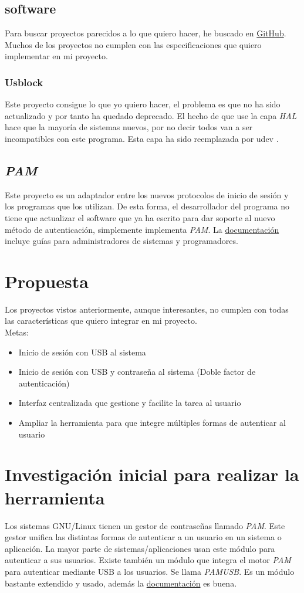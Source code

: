 \documentclass[titlepage]{article}
\begin{document}
\subsection{software}
Para buscar proyectos parecidos a lo que quiero hacer, he buscado en \href{https://github.com/}{GitHub}. Muchos de los proyectos no cumplen con las especificaciones que quiero implementar en mi proyecto. 
\subsubsection{Usblock \cite{usblock}}
Este proyecto consigue lo que yo quiero hacer, el problema es que no ha sido actualizado y por tanto ha quedado deprecado. El hecho de que use la capa \textit{\Gls{HAL}} hace que la mayoría de sistemas nuevos, por no decir todos van a ser incompatibles con este programa. Esta capa ha sido reemplazada por \Gls{udev} \cite{udev}.
\subsection{\textit{\Gls{PAM}}}
Este proyecto es un adaptador entre los nuevos protocolos de inicio de sesión y los programas que los utilizan. De esta forma, el desarrollador del programa no tiene que actualizar el software que ya ha escrito para dar soporte al nuevo método de autenticación, simplemente implementa \textit{\Gls{PAM}}. La \href{http://www.linux-pam.org/Linux-PAM-html/}{documentación} incluye guías para administradores de sistemas y programadores.
\section{Propuesta}
Los proyectos vistos anteriormente, aunque interesantes, no cumplen con todas las características que quiero integrar en mi proyecto.\\Metas:
\begin{itemize}
	\item Inicio de sesión con USB al sistema
	\item Inicio de sesión con USB y contraseña al sistema (Doble factor de autenticación)
	\item Interfaz centralizada que gestione y facilite la tarea al usuario
	\item Ampliar la herramienta para que integre múltiples formas de autenticar al usuario
\end{itemize}
\section{Investigación inicial para realizar la herramienta}
Los sistemas \Gls{GNU/Linux} tienen un gestor de contraseñas llamado \textit{\Gls{PAM}}. Este gestor unifica las distintas formas de autenticar a un usuario en un sistema o aplicación. La mayor parte de sistemas/aplicaciones usan este módulo para autenticar a sus usuarios. Existe también un módulo que integra el motor \textit{\Gls{PAM}} para autenticar mediante USB a los usuarios. Se llama \textit{\Gls{PAMUSB}}. Es un módulo bastante extendido y usado, además la \href{http://www.pamusb.org/#hotplug}{documentación} es buena.

\clearpage
\printglossaries
\clearpage
\printbibliography[heading=bibintoc,title={Bibliografía}]
\end{document}

